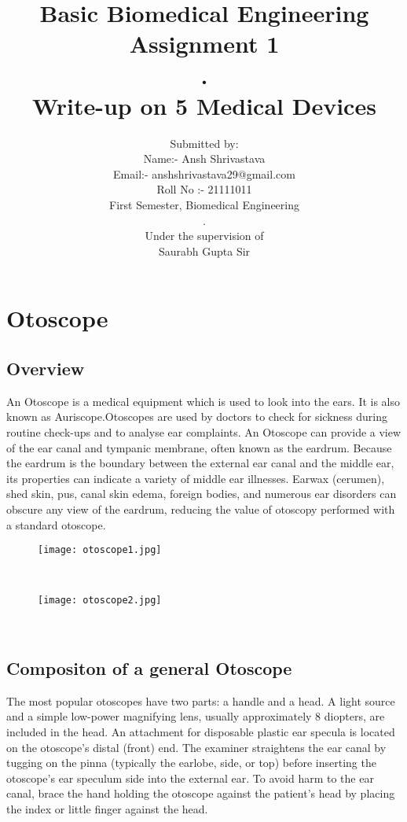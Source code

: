 \documentclass[12pt]{article}
\title{Basic Biomedical Engineering\\Assignment 1\\.\\Write-up on 5 Medical Devices}
\author{Submitted by: \\Name:- Ansh Shrivastava\\Email:- anshshrivastava29@gmail.com\\Roll No :- 21111011\\First Semester, Biomedical Engineering\\.\\Under the supervision of\\Saurabh Gupta Sir}
\begin{document}
\maketitle
\clearpage
\tableofcontents
\clearpage

\section{Otoscope}
\subsection{Overview}
An Otoscope is a medical equipment which is used to look into the ears. It is also known as Auriscope.Otoscopes are used by doctors to check for sickness during routine check-ups and to analyse ear complaints. An Otoscope can provide a view of the ear canal and tympanic membrane, often known as the eardrum. Because the eardrum is the boundary between the external ear canal and the middle ear, its properties can indicate a variety of middle ear illnesses. Earwax (cerumen), shed skin, pus, canal skin edema, foreign bodies, and numerous ear disorders can obscure any view of the eardrum, reducing the value of otoscopy performed with a standard otoscope.
\\
\begin{figure}[h]
\centering
\texttt{[image: otoscope1.jpg]}
\label{fig_otoscope1}
\end{figure}
\\
\begin{figure}[h]
\centering
\texttt{[image: otoscope2.jpg]}
\label{fig_otoscope2}
\end{figure}
\\
\subsection{Compositon of a general Otoscope}
The most popular otoscopes have two parts: a handle and a head. A light source and a simple low-power magnifying lens, usually approximately 8 diopters, are included in the head. An attachment for disposable plastic ear specula is located on the otoscope's distal (front) end. The examiner straightens the ear canal by tugging on the pinna (typically the earlobe, side, or top) before inserting the otoscope's ear speculum side into the external ear. To avoid harm to the ear canal, brace the hand holding the otoscope against the patient's head by placing the index or little finger against the head.
\\
\end{document}
